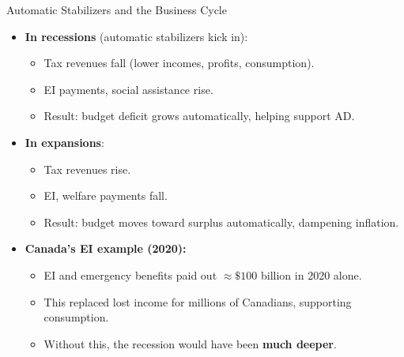 \documentclass[aspectratio=169]{beamer}
\begin{document}
\begin{frame}{Automatic Stabilizers and the Business Cycle}
\transfade
\begin{itemize}
  \item \textbf{In recessions} (automatic stabilizers kick in):
  \begin{itemize}
    \item Tax revenues \alert{fall} (lower incomes, profits, consumption).
    \item EI payments, social assistance \alert{rise}.
    \item Result: budget deficit grows automatically, helping support AD.
  \end{itemize}
  \item \textbf{In expansions}:
  \begin{itemize}
    \item Tax revenues \alert{rise}.
    \item EI, welfare payments \alert{fall}.
    \item Result: budget moves toward surplus automatically, dampening inflation.
  \end{itemize}
  \item \textbf{Canada's EI example (2020):}
  \begin{itemize}
    \item EI and emergency benefits paid out $\approx \$100$ billion in 2020 alone.
    \item This replaced lost income for millions of Canadians, supporting consumption.
    \item Without this, the recession would have been \textbf{much deeper}.
  \end{itemize}
\end{itemize}
\end{frame}
\end{document}
